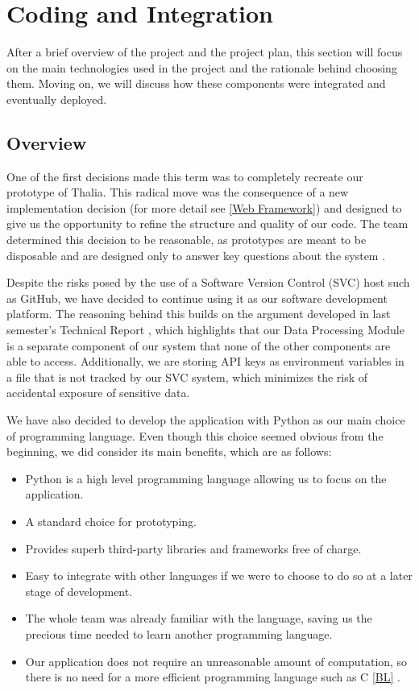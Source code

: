 \documentclass[main.tex]{subfiles}
\begin{document}
\section{Coding and Integration}

After a brief overview of the project and the project plan, this section will focus on the main technologies used in the project and the rationale behind choosing them. Moving on, we will discuss how these components were integrated and eventually deployed.

\subsection{Overview}

One of the first decisions made this term was to completely recreate our prototype of Thalia. This radical move was the consequence of a new implementation decision (for more detail see \ref{Web Framework}) and designed to give us the opportunity to refine the structure and quality of our code. The team determined this decision to be reasonable, as prototypes are meant to be disposable and are designed only to answer key questions about the system \cite{pragmaticprog}.

Despite the risks posed by the use of a Software Version Control (SVC) host such as GitHub, we have decided to continue using it as our software development platform. The reasoning behind this builds on the argument developed in last semester's Technical Report \cite{TR}, which highlights that our Data Processing Module is a separate component of our system that none of the other components are able to access. Additionally, we are storing API keys as environment variables in a file that is not tracked by our SVC system, which minimizes the risk of accidental exposure of sensitive data.

We have also decided to develop the application with Python as our main choice of programming language. Even though this choice seemed obvious from the beginning, we did consider its main benefits, which are as follows:

\begin{itemize}
    \item Python is a high level programming language allowing us to focus on the application.
    \item A standard choice for prototyping.
    \item Provides superb third-party libraries and frameworks free of charge.
    \item Easy to integrate with other languages if we were to choose to do so at a later stage of development.
    \item The whole team was already familiar with the language, saving us the precious time needed to learn another programming language.
    \item Our application does not require an unreasonable amount of computation, so there is no need for a more efficient programming language such as C \ref{BL} \cite{languagescomparison}.
\end{itemize}
\end{document}
